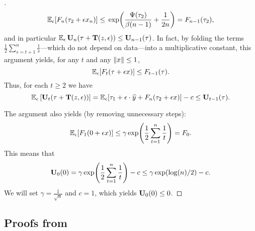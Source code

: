 \begin{proof}[]
  \[
    \En_{\eps}\brk*{F_{n}(\tau_{2} + \eps{}x_n)} \leq{} \exp\prn*{ \frac{\Psi(\tau_2)}{\beta(n-1)} + \frac{1}{2n}} = F_{n-1}(\tau_2),
  \]
  and in particular $\En_{\eps}\burk_{n}(\tau + \suff(z,\eps))\leq{}\burk_{n-1}(\tau)$.
  In fact, by folding the terms $\frac{1}{2}\sum_{s=t+1}^{n}\frac{1}{s}$---which do not depend on data---into a multiplicative constant, this argument yields, for any $t$ and any $\nrm*{x}\leq{}1$,
  \[
    \En_{\eps}\brk*{F_{t}(\tau + \eps{}x)} \leq{} F_{t-1}(\tau).
  \]
  Thus, for each $t\geq{}2$ we have
  \[
    \En_{\eps}\left[\burk_{t}(\tau + \suff(z,\eps))\right] = \En_{\eps}\brk*{\tau_{1} +  \eps\cdot\pred + F_{n}(\tau_{2} + \eps{}x)} - c \leq{} \burk_{t-1}(\tau).
  \]
  
The argument also yields (by removing unnecessary steps):
  \[
    \En_{\eps}\brk*{F_{1}(0 + \eps{}x)} \leq{} \gamma\exp\prn*{\frac{1}{2}\sum_{t=1}^{n}\frac{1}{t}} = F_{0}.
  \]
  This means that
  \[
    \burk_{0}(0) = \gamma\exp\prn*{\frac{1}{2}\sum_{t=1}^{n}\frac{1}{t}} - c \leq{} \gamma\exp\prn*{\log(n)/2} - c.
  \]
  We will set $\gamma=\frac{1}{\sqrt{n}}$ and $c=1$, which yields $\burk_{0}(0) \leq{} 0$.
  
\end{proof}

\subsection{Proofs from }

